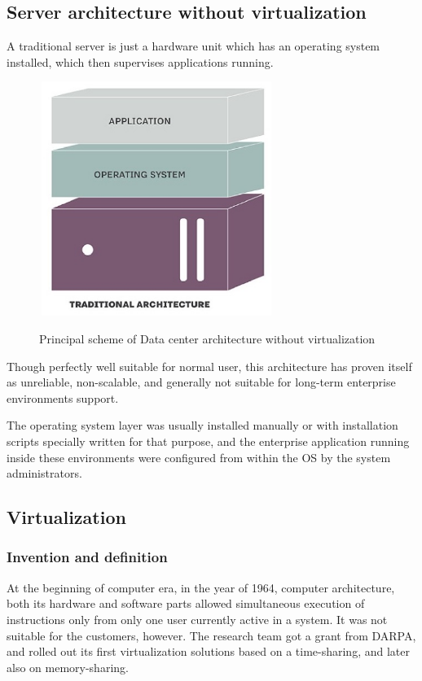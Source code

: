 \subsection{Server architecture without virtualization}

A traditional server is just a hardware unit
which has an operating system installed,
which then supervises applications running.

\begin{figure}
\includegraphics[height=3in, width=3in]{traditional}
\caption{Principal scheme of Data center architecture without virtualization}
\cite{TraditionalAndVirtualInfra}
\end{figure}

Though perfectly well suitable for normal user, this architecture
has proven itself as unreliable, non-scalable,
and generally not suitable for long-term enterprise environments support.

The operating system layer was usually installed manually or with
installation scripts specially written for that purpose,
and the enterprise application running inside these
environments were configured from within the OS by the system administrators.

\subsection{Virtualization}

\subsubsection{Invention and definition}

At the beginning of computer era, in the year of 1964,
computer architecture, both its hardware and software
parts allowed simultaneous execution of instructions only from only one user
currently active in a system. It was not suitable for the customers, however.
The research team got a grant from DARPA, and
rolled out its first virtualization solutions based on a time-sharing,
and later also on memory-sharing.


